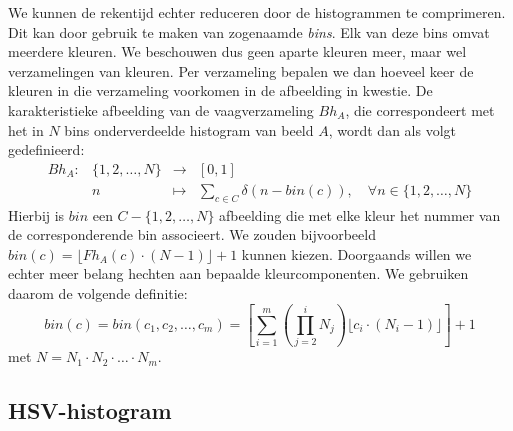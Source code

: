 We kunnen de rekentijd echter reduceren door de histogrammen te comprimeren. Dit kan door gebruik te 
maken van zogenaamde \emph{bins}. Elk van deze bins omvat meerdere kleuren. We beschouwen dus 
geen aparte kleuren meer, maar wel verzamelingen van kleuren. Per verzameling bepalen we dan 
hoeveel keer de kleuren in die verzameling voorkomen 
in de afbeelding in kwestie. De karakteristieke afbeelding van de vaagverzameling $Bh_A$, die
correspondeert met het in $N$ bins onderverdeelde histogram van beeld $A$, wordt dan als volgt
gedefinieerd:  
$$
\begin{array}{lrcl}
Bh_A: 	& \{1,2,\ldots,N\} 	& \to 		& [0,1] \\[5pt]
		& n						& \mapsto	& \displaystyle\sum_{c \in C} \delta (n -  bin(c)),
\quad\forall n \in \{1,2,\ldots,N\}
\end{array}
$$
Hierbij is $bin$ een $C - \{1,2,\ldots,N\}$ afbeelding die met elke kleur het nummer van de 
corresponderende bin associeert. We zouden bijvoorbeeld 
$bin(c) = \lfloor Fh_A(c) \cdot (N-1) \rfloor + 1$ kunnen kiezen. Doorgaands willen we echter
meer belang hechten aan bepaalde kleurcomponenten. We gebruiken daarom de volgende definitie:
$$
bin(c) = bin(c_1,c_2,\ldots,c_m) = \left[ \sum_{i=1}^m \left( \prod_{j=2}^{i} N_j \right) \lfloor c_i \cdot (N_i - 1)\rfloor \right] + 1
$$
met $N=N_1 \cdot N_2 \cdot \ldots \cdot N_m$.

\subsection{HSV-histogram}

